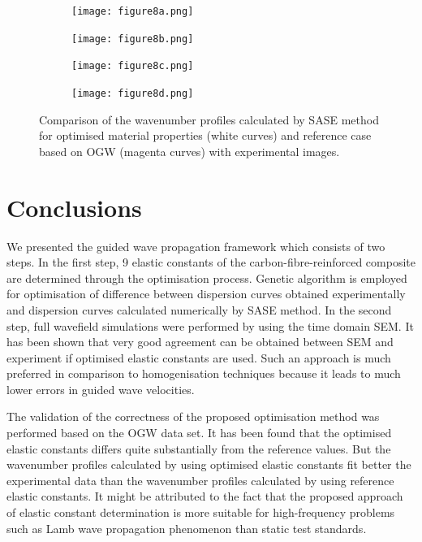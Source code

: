 \documentclass[preprint,12pt]{elsarticle}
\begin{document}
\begin{figure} [h!]
	\centering
	\begin{subfigure}[b]{0.47\textwidth}
		\centering
		\texttt{[image: figure8a.png]}
		\caption{}
		\label{fig:freq3_opt_Moll}
	\end{subfigure}
	\hfill
	\begin{subfigure}[b]{0.47\textwidth}
		\centering
		\texttt{[image: figure8b.png]}
		\label{fig:freq4_opt_Moll}
	\end{subfigure}
	\hfill
	\begin{subfigure}[b]{0.47\textwidth}
		\centering
		\texttt{[image: figure8c.png]}
		\label{fig:freq5_opt_Moll}
	\end{subfigure}
	\hfill
	\begin{subfigure}[b]{0.47\textwidth}
		\centering
		\texttt{[image: figure8d.png]}
		\label{fig:freq7_opt_Moll}
	\end{subfigure}
	\caption{Comparison of the wavenumber profiles calculated by SASE method for optimised material properties (white curves) and reference case based on OGW (magenta curves) with experimental images.}
	\label{fig:freq_slice_opt_Moll}
\end{figure}
\clearpage
\section{Conclusions}
We presented the guided wave propagation framework which consists of two steps. 
In the first step, 9 elastic constants of the carbon-fibre-reinforced composite are determined through the optimisation process. 
Genetic algorithm is employed for optimisation of difference between dispersion curves obtained experimentally and dispersion curves calculated numerically by SASE method.
In the second step, full wavefield simulations were performed by using the time domain SEM. 
It has been shown that very good agreement can be obtained between SEM and experiment if optimised elastic constants are used. 
Such an approach is much preferred in comparison to homogenisation techniques because it leads to much lower errors in guided wave velocities.

The validation of the correctness of the proposed optimisation method was performed based on the OGW data set.
It has been found that the optimised elastic constants differs quite substantially from the reference values. 
But the wavenumber profiles calculated by using optimised elastic constants fit better the experimental data than the wavenumber profiles calculated by using reference elastic constants.
It might be attributed to the fact that the proposed approach of elastic constant determination is more suitable for high-frequency problems such as Lamb wave propagation phenomenon than static test standards.
\end{document}

